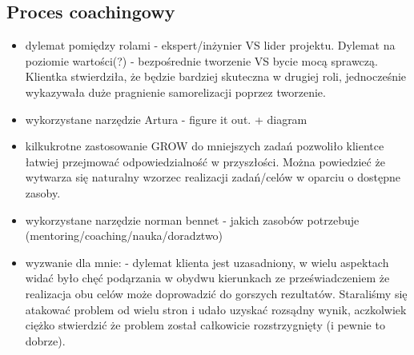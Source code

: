 \subsection{Proces coachingowy}
\begin{itemize}
  \item dylemat pomiędzy rolami - ekspert/inżynier VS lider projektu. Dylemat na poziomie wartości(?) - bezpośrednie tworzenie VS bycie mocą sprawczą. Klientka stwierdziła, że będzie bardziej
  skuteczna w drugiej roli, jednocześnie wykazywała duże pragnienie samorelizacji poprzez tworzenie.
  \item wykorzystane narzędzie Artura - figure it out. + diagram
  \item kilkukrotne zastosowanie GROW do mniejszych zadań pozwoliło klientce łatwiej przejmować odpowiedzialność w przyszłości. Można powiedzieć że wytwarza się naturalny wzorzec realizacji zadań/celów w oparciu o dostępne zasoby.
  \item wykorzystane narzędzie norman bennet - jakich zasobów potrzebuje (mentoring/coaching/nauka/doradztwo)
  \item wyzwanie dla mnie: - dylemat klienta jest uzasadniony, w wielu aspektach widać było chęć podąrzania w obydwu kierunkach ze przeświadczeniem że realizacja obu celów może doprowadzić do gorszych rezultatów. Staraliśmy się atakować problem od wielu stron i udało uzyskać rozsądny wynik, aczkolwiek ciężko stwierdzić że problem został całkowicie rozstrzygnięty (i pewnie to dobrze).
\end{itemize}

